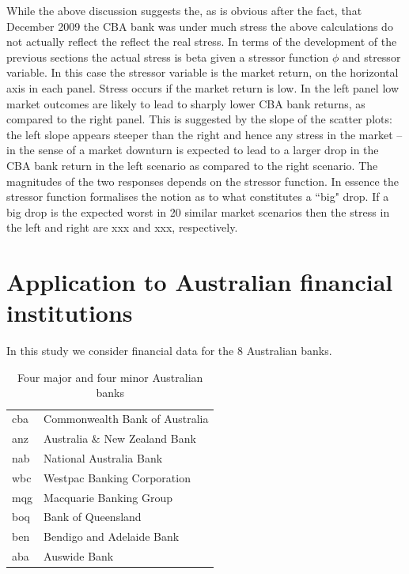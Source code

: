 \documentclass[authoryear]{elsarticle}
\begin{document}
While the above discussion suggests the, as is obvious after the fact, that December 2009 the CBA bank was under much stress the above calculations do not actually reflect the reflect the real stress.   In terms of the development of the previous sections the actual stress is beta given a stressor function $\phi$ and stressor variable.   In this case the stressor variable is the market return, on the horizontal axis in each panel.   Stress occurs if the market return is low.   In the left panel low market outcomes are likely to lead to sharply lower CBA bank returns, as compared to the right panel.   This is suggested by the slope of the scatter plots:  the left slope appears steeper than the right and hence any stress in the market -- in the sense of a market downturn is expected to lead to a larger drop in the CBA bank return in the left scenario as compared to the right scenario.   The magnitudes of the two responses depends on the stressor function.   In essence the stressor function formalises the notion as to what constitutes a ``big" drop.   If a big drop is the expected worst in 20 similar market scenarios then the stress in the left and right are xxx and xxx, respectively.        



\section{Application to Australian financial institutions}

In this study we consider financial data for  the 8 Australian banks.

\begin{table}[htdp]
\caption{Four major and four minor Australian banks}
\begin{center}
\begin{tabular}{l|l}
\hline
cba & Commonwealth Bank of Australia\\
anz & Australia \& New Zealand Bank\\
nab & National Australia Bank\\
wbc & Westpac Banking Corporation\\
\hline
mqg & Macquarie Banking Group\\
boq & Bank of Queensland\\
ben & Bendigo and Adelaide Bank\\
aba & Auswide Bank\\
\hline
\end{tabular}
\end{center}
\label{banks}
\end{table}%
\end{document}
